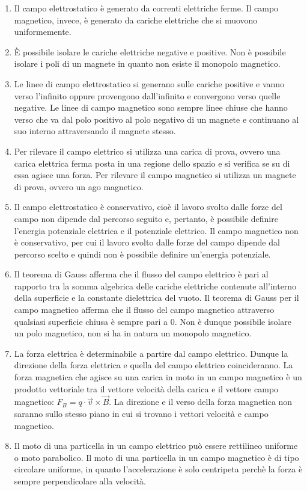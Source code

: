 \documentclass[12pt]{report}
\begin{document}
\begin{enumerate}
	\item Il campo elettrostatico è generato da correnti elettriche ferme. Il campo magnetico, invece, è generato da cariche elettriche che si muovono uniformemente.
	\item È possibile isolare le cariche elettriche negative e positive. Non è possibile isolare i poli di un magnete in quanto non esiste il monopolo magnetico.
	\item Le linee di campo elettrostatico si generano sulle cariche positive e vanno verso l'infinito oppure provengono dall'infinito e convergono verso quelle negative. Le linee di campo magnetico sono sempre linee chiuse che hanno verso che va dal polo positivo al polo negativo di un magnete e continuano al suo interno attraversando il magnete stesso.
	\item  Per rilevare il campo elettrico si utilizza una carica di prova, ovvero una carica elettrica ferma posta in una regione dello spazio e si verifica se su di essa agisce una forza. Per rilevare il campo magnetico si utilizza un magnete di prova, ovvero un ago magnetico.
	\item Il campo elettrostatico è conservativo, cioè il lavoro svolto dalle forze del campo non dipende dal percorso seguito e, pertanto, è possibile definire l'energia potenziale elettrica e il potenziale elettrico. Il campo magnetico non è conservativo, per cui il lavoro svolto dalle forze del campo dipende dal percorso scelto e quindi non è possibile definire un'energia potenziale.
	\item Il teorema di Gauss afferma che il flusso del campo elettrico è pari al rapporto tra la somma algebrica delle cariche elettriche contenute all'interno della superficie e la constante dielettrica del vuoto. Il teorema di Gauss per il campo magnetico afferma che il flusso del campo magnetico attraverso qualsiasi superficie chiusa è sempre pari a 0. Non è dunque possibile isolare un polo magnetico, non si ha in natura un monopolo magnetico.
	\item La forza elettrica è determinabile a partire dal campo elettrico. Dunque la direzione della forza elettrica e quella del campo elettrico coincideranno. La forza magnetica che agisce su una carica in moto in un campo magnetico è un prodotto vettoriale tra il vettore velocità della carica e il vettore campo magnetico: $F_B = q \cdot \vec{v} \times \vec{B}$. La direzione e il verso della forza magnetica non saranno sullo stesso piano in cui si trovano i vettori velocità e campo magnetico.
	\item Il moto di una particella in un campo elettrico può essere rettilineo uniforme o moto parabolico. Il moto di una particella in un campo magnetico è di tipo circolare uniforme, in quanto l'accelerazione è solo centripeta perchè la forza è sempre perpendicolare alla velocità.
\end{enumerate}
\end{document}
